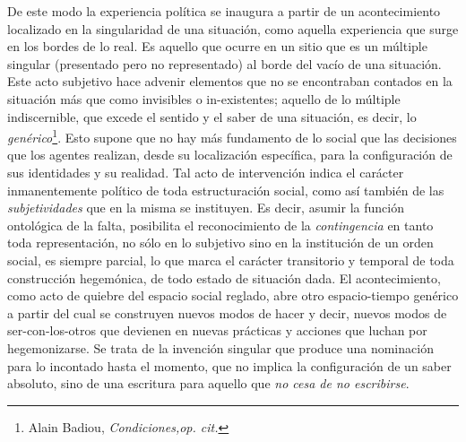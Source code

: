 De este modo la experiencia política se inaugura a partir de un acontecimiento localizado en la singularidad de una situación, como aquella experiencia que surge en los bordes de lo real. Es aquello que ocurre en un sitio que es un múltiple singular (presentado pero no representado) al borde del vacío de una situación. Este acto subjetivo hace advenir elementos que no se encontraban contados en la situación más que como invisibles o in-existentes; aquello de lo múltiple indiscernible, que excede el sentido y el saber de una situación, es decir, lo \emph{genérico}\footnote{Alain Badiou, \emph{Condiciones,op. cit.}}. Esto supone que no hay más fundamento de lo social que las decisiones que los agentes realizan, desde su localización específica, para la configuración de sus identidades y su realidad. Tal acto de intervención indica el carácter inmanentemente político de toda estructuración social, como así también de las \emph{subjetividades} que en la misma se instituyen. Es decir, asumir la función ontológica de la falta, posibilita el reconocimiento de la \emph{contingencia} en tanto toda representación, no sólo en lo subjetivo sino en la institución de un orden social, es siempre parcial, lo que marca el carácter transitorio y temporal de toda construcción hegemónica, de todo estado de situación dada. El acontecimiento, como acto de quiebre del espacio social reglado, abre otro espacio-tiempo genérico a partir del cual se construyen nuevos modos de hacer y decir, nuevos modos de ser-con-los-otros que devienen en nuevas prácticas y acciones que luchan por hegemonizarse. Se trata de la invención singular que produce una nominación para lo incontado hasta el momento, que no implica la configuración de un saber absoluto, sino de una escritura para aquello que \emph{no cesa de no escribirse}.

